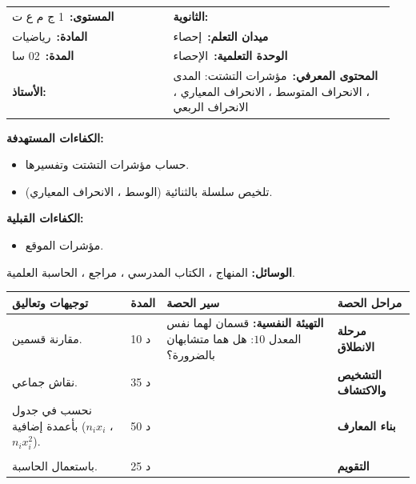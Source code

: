 \documentclass[12pt,a4paper]{article}
\makeatletter
\newenvironment{LTR}{\begin{otherlanguage}{english}}{\end{otherlanguage}}
\newcommand{\ar}[1]{\foreignlanguage{arabic}{#1}}
\newcommand{\Phase}[1]{\textbf{#1}}
\newcommand{\Fld}[2]{\textbf{#1:}\ #2}
\newcommand{\ModhHead}[9]{%
\begin{LTR}
\begin{tcolorbox}[enhanced,colback=white,colframe=cThm!85!black,arc=4mm,boxrule=1pt,top=14pt,bottom=6pt,left=8pt,right=8pt,
 overlay={\node[fill=cThm!85!black,text=white,rounded corners=3mm,inner xsep=14pt,inner ysep=4pt,font=\large\bfseries] at ([yshift=0pt]frame.north){\ar{مذكرة رقم #1}};},
 before upper={\selectlanguage{arabic}}]
\begin{tabular}{@{}p{0.4\linewidth}p{0.55\linewidth}@{}}
\Fld{المستوى}{#2} & \Fld{الثانوية}{\dotfill}\\[3pt]
\Fld{المادة}{رياضيات} & \Fld{ميدان التعلم}{#3}\\[3pt]
\Fld{المدة}{#5} & \Fld{الوحدة التعلمية}{#4}\\[3pt]
\Fld{الأستاذ}{\dotfill} & \Fld{المحتوى المعرفي}{#6}\\
\end{tabular}
\end{tcolorbox}
\begin{tcolorbox}[enhanced,colback=white,colframe=cThm!85!black,arc=3mm,boxrule=0.8pt,sidebyside,sidebyside align=top,lefthand ratio=0.5,
 segmentation style={dashed,cThm!60},before upper={\selectlanguage{arabic}},before lower={\selectlanguage{arabic}}]
\textbf{الكفاءات المستهدفة:}\par #8
\tcblower
\textbf{الكفاءات القبلية:}\par #7
\end{tcolorbox}
\end{LTR}
\par\smallskip\textbf{الوسائل:} #9\par\smallskip}
\newenvironment{Sayr}{%
\begin{LTR}\renewcommand{\arraystretch}{1.25}
\begin{longtable}{|p{0.17\textwidth}|>{\centering\arraybackslash}p{0.06\textwidth}|p{0.53\textwidth}|>{\centering\arraybackslash}p{0.12\textwidth}|}
\hline\rowcolor{cThm!12}\ar{\textbf{توجيهات وتعاليق}} & \ar{\textbf{المدة}} & \ar{\textbf{سير الحصة}} & \ar{\textbf{مراحل الحصة}}\\\hline\endhead
\hline\endfoot}{\end{longtable}\end{LTR}}
\newcommand{\Row}[4]{\ar{\small #4} & \ar{#3} & \ar{#2} & \cellcolor{cThm!8}\ar{\Phase{#1}}\\\hline}
\newcommand{\Lab}[2]{\foreignlanguage{english}{\tcbox[on line,colback=#1,colframe=#1,boxrule=0pt,arc=2pt,boxsep=1pt,left=5pt,right=5pt,top=1pt,bottom=1pt]{\ar{\textcolor{white}{\textbf{#2}}}}}}
\newcommand{\ck}{\ensuremath{{\color{cRem}\checkmark}}}
\makeatother
\begin{document}
\newpage
\ModhHead{51}{1 ج م ع ت}{إحصاء}{الإحصاء}{02 سا}{مؤشرات التشتت: المدى ، الانحراف المتوسط ، الانحراف المعياري ، الانحراف الربعي}%
{\begin{itemize}\item مؤشرات الموقع.\end{itemize}}%
{\begin{itemize}\item حساب مؤشرات التشتت وتفسيرها.\item تلخيص سلسلة بالثنائية (الوسط ، الانحراف المعياري).\end{itemize}}%
{المنهاج ، الكتاب المدرسي ، مراجع ، الحاسبة العلمية.}
\begin{Sayr}
\Row{مرحلة الانطلاق}{%
\textbf{التهيئة النفسية:} قسمان لهما نفس المعدل $10$: هل هما متشابهان بالضرورة؟}{10 د}{مقارنة قسمين.}
\Row{التشخيص والاكتشاف}{%
\Lab{cEx}{وضعية مقترحة}\par القسم (أ): علامات كلها بين $9$ و $11$ ؛ القسم (ب): علامات بين $2$ و $18$ ، والوسط $10$ في الحالتين.\par\ck\ الوسط لا يكفي: نحتاج مؤشراً يقيس \textbf{تشتت} القيم حول الوسط.\par
}{35 د}{نقاش جماعي.}
\Row{بناء المعارف}{%
\Lab{cDef}{تعريف}\par\ck\ \textbf{المدى:} أكبر قيمة $-$ أصغر قيمة.\par
\ck\ \textbf{الانحراف المتوسط:} $\dfrac1N\sum n_i|x_i-\bar x|$.\par
\ck\ \textbf{التباين} $V=\dfrac1N\sum n_ix_i^2-\bar x^2$ و\textbf{الانحراف المعياري} $\sigma=\sqrt V$.\par
\ck\ \textbf{الربيعان} $Q_1$ و $Q_3$ ، و\textbf{الانحراف الربعي} $Q_3-Q_1$.\par
\Lab{cEx}{سلسلة العلامات (المذكرة 48)}\par\ck\ المدى $16-4=12$ ؛ الانحراف المتوسط $\dfrac{72}{30}=2{,}4$.\par
\ck\ $V=\dfrac{3288}{30}-10^2=9{,}6$ ، $\sigma\approx3{,}10$.\par
\ck\ $Q_1$ هي القيمة $8$ في الترتيب: $Q_1=8$ ؛ $Q_3$ هي القيمة $23$: $Q_3=12$ ؛ الانحراف الربعي $4$.\par
}{50 د}{نحسب في جدول بأعمدة إضافية ($n_ix_i$ ، $n_ix_i^2$).}
\Row{}{%
\Lab{cRem}{ملاحظات}\ نلخص السلسلة بـ $(\bar x;\sigma)=(10;3{,}1)$ ؛ كلما صغر $\sigma$ كانت القيم متمركزة حول الوسط.\par\Lab{cThm!80!black}{حذار}\ نستعمل الحاسبة (الوضع الإحصائي) للتحقق.}{}{}
\Row{التقويم}{%
\Lab{cEx}{تطبيق}\par السلسلة: $8$ ، $9$ ، $10$ ، $11$ ، $12$. احسب الوسط والمدى والانحراف المعياري.\par\textbf{الحل:} $\bar x=10$ ؛ المدى $4$ ؛ $V=\dfrac{4+1+0+1+4}5=2$ ، $\sigma=\sqrt2\approx1{,}41$.\par\textbf{واجب منزلي:} تمارين من الكتاب المدرسي.\par\smallskip\textbf{ملاحظات حول سير الحصة:} \dotfill}{25 د}{باستعمال الحاسبة.}
\end{Sayr}
\end{document}
